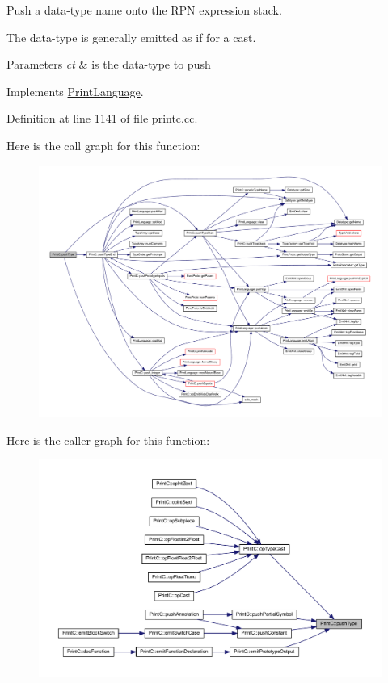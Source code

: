 Push a data-\/type name onto the R\+PN expression stack. 

The data-\/type is generally emitted as if for a cast. 
\begin{DoxyParams}{Parameters}
{\em ct} & is the data-\/type to push \\
\hline
\end{DoxyParams}


Implements \mbox{\hyperlink{class_print_language_a4bd65e5a27a60ab1b5590673c6396a4f}{Print\+Language}}.



Definition at line 1141 of file printc.\+cc.

Here is the call graph for this function\+:
\nopagebreak
\begin{figure}[H]
\begin{center}
\leavevmode
\includegraphics[width=350pt]{class_print_c_a210e44709553449b4d03596f137dfb10_cgraph}
\end{center}
\end{figure}
Here is the caller graph for this function\+:
\nopagebreak
\begin{figure}[H]
\begin{center}
\leavevmode
\includegraphics[width=350pt]{class_print_c_a210e44709553449b4d03596f137dfb10_icgraph}
\end{center}
\end{figure}
\mbox{\label{class_print_c_a45d0e43f9f4e91353db9aeb4c053deaa}} 
